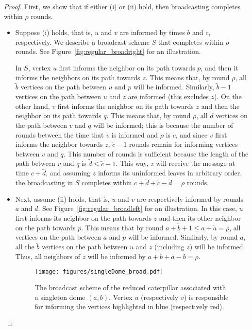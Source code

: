 \documentclass[letterpaper,11pt]{article}
\newcommand{\cater}{reduced caterpillar\xspace}
\begin{document}
\begin{proof}
First, we show that if either (i) or (ii) hold, then broadcasting completes within $\rho$ rounds.

\begin{itemize}
    \item 
Suppose (i) holds, that is, $u$ and $v$ are informed by times $b$ and $c$, respectively. 
We describe a broadcast scheme $S$ that completes within $\rho$ rounds. See Figure~\ref{fig:regular_broadright} for an illustration. 

In $S$, vertex $u$ first informs the neighbor on its path towards $p$, and then it informs the neighbors on its path towards $z$. This means that, by round $\rho$, all $\tilde{b}$ vertices on the path between $u$ and $p$ will be informed. Similarly, $\tilde{b}-1$ vertices on the path between $u$ and $z$ are informed (this excludes $z$). 
On the other hand, $v$ first informs the neighbor on its path towards $z$ and then the neighbor on its path towards $q$. 
This means that, by round $\rho$, all $\tilde{d}$ vertices on the path between $v$ and $q$ will be informed; this is because the number of rounds between the time that $v$ is informed and $\rho$ is $\tilde{c}$, and since $v$ first informs the neighbor towards $z$, $\tilde{c}-1$ rounds remain for informing vertices between $v$ and $q$. This number of rounds is sufficient because the length of the path between $v$ and $q$ is $\tilde{d}\leq \tilde{c}-1$. This way, $z$ will receive the message at time $c+\tilde{d}$, and assuming $z$ informs its uninformed leaves in arbitrary order, the broadcasting in $S$ completes within $c + \tilde{d} + \tilde{c} - \tilde{d} = \rho$ rounds.

\item Next, assume (ii) holds, that is, $u$ and $v$ are respectively informed by rounds $a$ and $d$. See Figure~\ref{fig:regular_broadleft} for an illustration. In this case, $u$ first informs its neighbor on the path towards $z$ and then its other neighbor on the path towards $p$. 
This means that by round $a+\tilde{b} + 1 \leq a+\tilde{a} = \rho$, all vertices on the path between $a$ and $p$ will be informed. Similarly, by round $a$, all the $\tilde{b}$ vertices on the path between $u$ and $z$ (including $z$) will be informed. Thus, all neighbors of $z$ will be informed by $a+\bar{b} + \bar{a}-\bar{b} = \rho$. 


\begin{figure}
    \centering
        \texttt{[image: figures/singleDome\_broad.pdf]} \caption{
        The broadcast scheme of the \cater 
        associated with a singleton dome $(a,b)$.
        Vertex $u$ (respectively $v$) is responsible for informing the vertices highlighted in blue (respectively red).}
	\label{fig:singleDome_broad}
\end{figure}


\end{itemize}
\end{proof}
\end{document}
